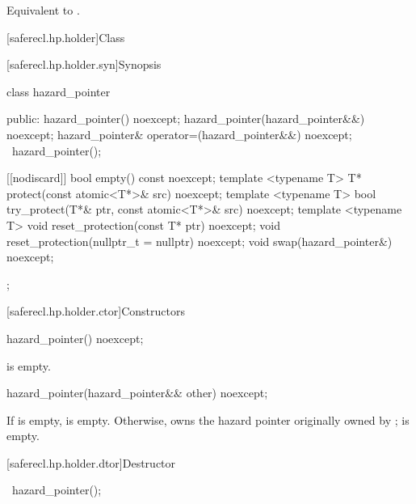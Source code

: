 \begin{itemdescr}

\effects 
Equivalent to .

\end{itemdescr}

[saferecl.hp.holder]{Class }

[saferecl.hp.holder.syn]{Synopsis}

\begin{codeblock}
class hazard_pointer {
public:
  hazard_pointer() noexcept;
  hazard_pointer(hazard_pointer&&) noexcept;
  hazard_pointer& operator=(hazard_pointer&&) noexcept;
  ~hazard_pointer();
  
  [[nodiscard]] bool empty() const noexcept;
  template <typename T> T* protect(const atomic<T*>& src) noexcept;  
  template <typename T> bool try_protect(T*& ptr, const atomic<T*>& src) noexcept;
  template <typename T> void reset_protection(const T* ptr) noexcept;
  void reset_protection(nullptr_t = nullptr) noexcept;
  void swap(hazard_pointer&) noexcept;
};
\end{codeblock}

[saferecl.hp.holder.ctor]{Constructors}

\begin{itemdecl}
hazard_pointer() noexcept;
\end{itemdecl}

\begin{itemdescr}

\ensures 
{} is empty.

\end{itemdescr}

\begin{itemdecl}
hazard_pointer(hazard_pointer&& other) noexcept;
\end{itemdecl}

\begin{itemdescr}

\ensures 
If  is empty,  is empty. Otherwise,  owns the hazard pointer originally owned by ;  is empty.

\end{itemdescr}

[saferecl.hp.holder.dtor]{Destructor}

\begin{itemdecl}
~hazard_pointer();
\end{itemdecl}

